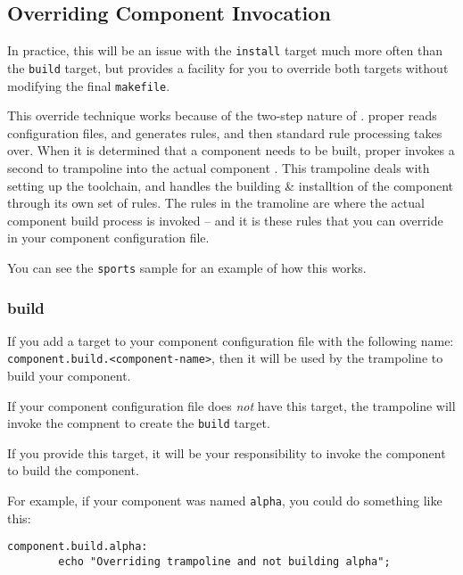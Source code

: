 \subsection{Overriding Component \makefile
  Invocation}\label{wrap:override-target}

In practice, this will be an issue with the \texttt{install} target
much more often than the \texttt{build} target, but \lmsbw provides a
facility for you to override both targets without modifying the final
\texttt{makefile}.

This override technique works because of the two-step nature of
\lmsbw.  \lmsbw proper reads configuration files, and generates \make
rules, and then standard \make rule processing takes over.  When it is
determined that a component needs to be built, \lmsbw proper invokes a
second \makefile to trampoline into the actual component \makefile.
This trampoline deals with setting up the toolchain, and handles the
building \& installtion of the component through its own set of \make
rules.  The \make rules in the tramoline \makefile are where the
actual component build process is invoked -- and it is these rules
that you can override in your component configuration file.

You can see the \texttt{sports} sample for an example of how this
works.

\subsubsection{build}\label{wrap:override-target-build}

If you add a \makefile target to your component configuration file
with the following name:
\texttt{component.build.}\texttt{<component-name>}, then it will be
used by the trampoline \makefile to build your component.

If your component configuration file does \emph{not} have this target,
the trampoline \makefile will invoke the compnent \makefile to create
the \texttt{build} target.

If you provide this target, it will be your responsibility to invoke
the component \makefile to build the component.

For example, if your component was named \texttt{alpha}, you could do
something like this:

\begin{verbatim}
component.build.alpha:
        echo "Overriding trampoline and not building alpha";

\end{verbatim}

